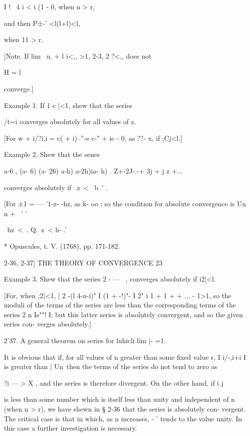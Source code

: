 I ! \ 4 i < i (1 - 0, when n > r,



and then P±-' <l(l+l)<l,

when 11 > r.

[Note. If lim \ u, + l i<,, >1, %
2-3, 2 ?<,, does not

H = l

converge.]

Example 1. If 1 c |<1, shew that the series

/t=i converges absolutely for all values of z.

[For w + i/?i,i = c( + i)--''-e c-" + ie - 0, as ??- x, if ;Cj<l.]

Example 2. Shew that the senes



a-6 , (a- 6) (a- 26) a-h) a-2h)ia- h) . Z+-2J-.-+ 3j + j z +...

converges absolutely if \ z\ < \ b~' .



[For ±1 = — '1-z- -hz, as k- oo ; so the condition for absolute
convergence is Un n + \ ' '

\ hz\ < \,. Q.\ z\ < h- .'\

* Opuscules, t. V. (1768), pp. 171-182.



2-36, 2-37] THE THEORY OF CONVERGENCE 23

Example 3. Shew that the series 2 - — \ , converges absolutely if
i2|<l.

[For, when ;2|<1, | 2 -(l 4-n-i)" I (1 + -!)"- I 2" i 1 + 1 + + ... -
1>1, so the moduli of the terms of the series are less than the
corresponding terms of the series 2 n Is""! I; but this latter series
is absolutely convergent, and so the given series con- verges
absolutely.]

2'37. A general theorem on series for luhicli lim |- =1.

It is obvious that if, for all values of n greater than some fixed
value r, I i/-,i+i I is greater than | Un\, then the terms of the
series do not tend to zero as

?i — > X , and the series is therefore divergent. On the other hand,
if i j

is less than some number which is itself less than unity and
independent of n (when n > r), we have shewn in § 2-36 that the series
is absolutely con- vergent. The critical case is that in which, as n
increases, - ' tends to the value unity. In this case a further
investigation is necessary.

